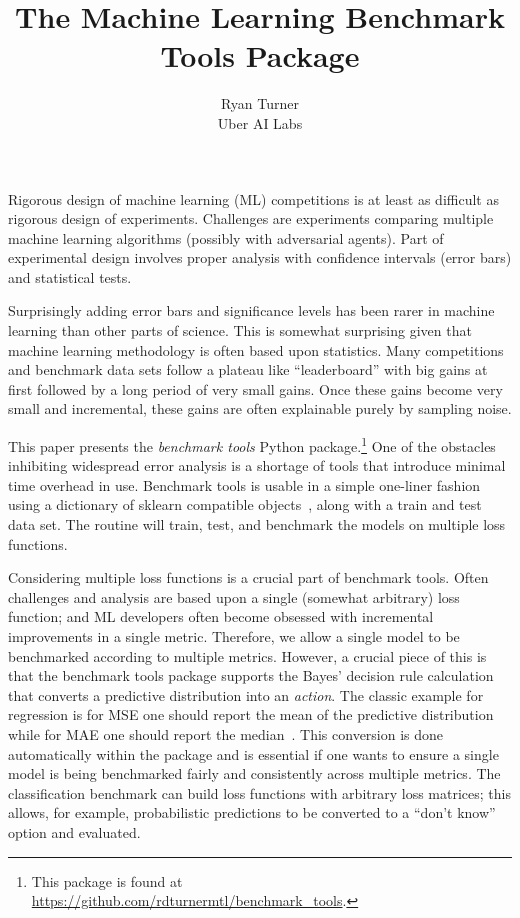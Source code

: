 \documentclass{article}
\title{The Machine Learning Benchmark Tools Package}
\author{
  Ryan Turner \\
  Uber AI Labs
}
\begin{document}

\maketitle

Rigorous design of machine learning (ML) competitions is at least as difficult as rigorous design of experiments.
Challenges are experiments comparing multiple machine learning algorithms (possibly with adversarial agents)\@.
Part of experimental design involves proper analysis with confidence intervals (error bars) and statistical tests.

Surprisingly adding error bars and significance levels has been rarer in machine learning than other parts of science.
This is somewhat surprising given that machine learning methodology is often based upon statistics.
Many competitions and benchmark data sets follow a plateau like ``leaderboard'' with big gains at first followed by a long period of very small gains.
Once these gains become very small and incremental, these gains are often explainable purely by sampling noise.

This paper presents the \emph{benchmark tools} Python package.\footnote{This package is found at
\url{https://github.com/rdturnermtl/benchmark_tools}.}
One of the obstacles inhibiting widespread error analysis is a shortage of tools that introduce minimal time overhead in use.
Benchmark tools is usable in a simple one-liner fashion using a dictionary of sklearn compatible objects~\citep{Pedregosa2011}, along with a train and test data set.
The routine will train, test, and benchmark the models on multiple loss functions.

Considering multiple loss functions is a crucial part of benchmark tools.
Often challenges and analysis are based upon a single (somewhat arbitrary) loss function; and ML developers often become obsessed with incremental improvements in a single metric.
Therefore, we allow a single model to be benchmarked according to multiple metrics.
However, a crucial piece of this is that the benchmark tools package supports the Bayes' decision rule calculation that converts a predictive distribution into an \emph{action}.
The classic example for regression is for MSE one should report the mean of the predictive distribution while for MAE one should report the median~\citep{Marchini2013}.
This conversion is done automatically within the package and is essential if one wants to ensure a single model is being benchmarked fairly and consistently across multiple metrics.
The classification benchmark can build loss functions with arbitrary loss matrices; this allows, for example, probabilistic predictions to be converted to a ``don't know'' option and evaluated.
\end{document}
